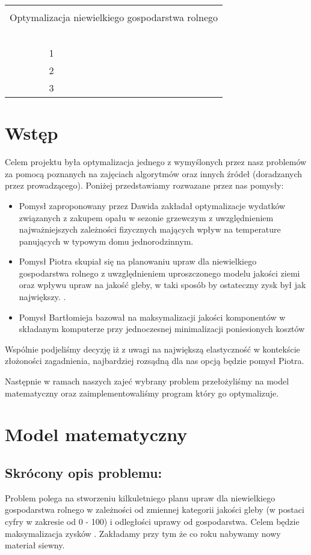 \documentclass{article}
\newcommand{\AASprTab}[5]{


\begin{center}
\begin{tabular}{ p{0.06\textwidth} p{0.2\textwidth} p{0.2\textwidth} p{0.2\textwidth} p{0.2\textwidth} p{0.2\textwidth} }

  &   &   &   &   \\
\hline
\multicolumn{6}{|c|}{}\\[-1ex]
\multicolumn{6}{|c|}{{\LARGE Optymalizacja niewielkiego gospodarstwa rolnego}} \\
\multicolumn{6}{|c|}{}\\[-1ex]



\hline
\multicolumn{2}{|l|}{\AASprTabFieldDsc{Wydział}} & \multicolumn{2}{|l|}{\AASprTabFieldDsc{Kierunek}} & \multicolumn{2}{|l|}{\AASprTabFieldDsc{Rok}} \\
\multicolumn{2}{|c|}{\AASprTabFieldVar{EAIiIB}} & \multicolumn{2}{|c|}{\AASprTabFieldVar{Automatyka i Robotyka}} & \multicolumn{2}{|c|}{\AASprTabFieldVar{III}} \\



\hline
\multicolumn{1}{|c|}{\tiny{ }} &
\multicolumn{5}{|c|}{\tiny{ }} \\
\multicolumn{1}{|c|}{\AASprTabFieldDscH{L.p.}} &
\multicolumn{5}{|l|}{\AASprTabFieldDscH{Skład grupy ćwiczeniowej}}\\

\hline
\multicolumn{1}{|c|}{1} &
\multicolumn{5}{|l|}{\AASprTabFieldVar{#3}}\\

\hline
\multicolumn{1}{|c|}{2} &
\multicolumn{5}{|l|}{\AASprTabFieldVar{#4}}\\

\hline
\multicolumn{1}{|c|}{3} &
\multicolumn{5}{|l|}{\AASprTabFieldVar{#5}}\\

\hline
\end{tabular}
\end{center}
}
\begin{document}
\AASprTab { Asynchroniczny silnik klatkowy z falownikiem }{16 grudnia 2022 r.}{Bartłomiej Matuszewski}{Piotr Mamos}{Dawid Maziarski}

\tableofcontents

\section{Wstęp}
Celem projektu była optymalizacja jednego z wymyślonych przez nasz problemów za pomocą poznanych na zajęciach algorytmów oraz innych źródeł (doradzanych przez prowadzącego).
Poniżej przedstawiamy rozwazane przez nas pomysły:
\begin{itemize}
	\item Pomysł zaproponowany przez Dawida zakładał optymalizacje wydatków związanych z zakupem opału w sezonie grzewczym z uwzględnieniem najważniejszych zależności fizycznych mających wpływ na temperature panujących w typowym domu jednorodzinnym.
	\item Pomysł Piotra skupiał się na planowaniu upraw dla niewielkiego gospodarstwa rolnego z uwzględnieniem uproszczonego modelu jakości ziemi oraz wpływu upraw na jakość gleby, w taki sposób by ostateczny zysk był jak największy. .
	\item Pomysł Bartłomieja bazował na maksymalizacji jakości komponentów w składanym komputerze przy jednoczesnej minimalizacji poniesionych kosztów
\end{itemize}

Wspólnie podjeliśmy decyzję iż z uwagi na największą elastyczność w kontekście złożoności zagadnienia, najbardziej rozsądną dla nas opcją będzie pomysł Piotra.

Następnie w ramach naszych zajeć wybrany problem przełożyliśmy na model matematyczny oraz zaimplementowaliśmy program który go optymalizuje.

\section{Model matematyczny}

	\subsection{Skrócony opis problemu:}
	Problem polega na stworzeniu kilkuletniego planu upraw dla niewielkiego gospodarstwa rolnego w zależności od zmiennej kategorii jakości gleby (w postaci cyfry w zakresie od 0 - 100) i  odległości uprawy od gospodarstwa. Celem będzie maksymalizacja zysków . Zakładamy przy tym że co roku nabywamy nowy materiał siewny.
\end{document}
